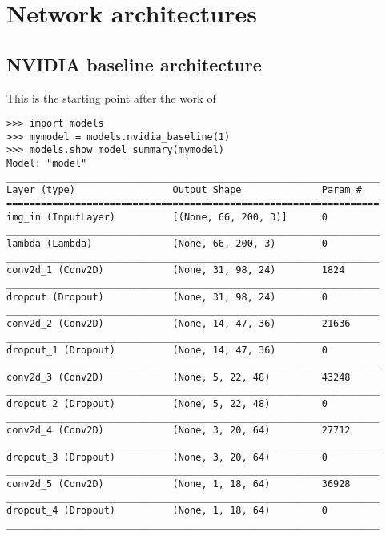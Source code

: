 \chapter{Network architectures} %

\label{AppendixB} %

\section{NVIDIA baseline architecture}
\label{NVIDIA_baseline}
This is the starting point after the work of \cite{bojarski2016end}

\begin{verbatim}
>>> import models
>>> mymodel = models.nvidia_baseline(1)
>>> models.show_model_summary(mymodel)
Model: "model"
_________________________________________________________________
Layer (type)                 Output Shape              Param #   
=================================================================
img_in (InputLayer)          [(None, 66, 200, 3)]      0         
_________________________________________________________________
lambda (Lambda)              (None, 66, 200, 3)        0         
_________________________________________________________________
conv2d_1 (Conv2D)            (None, 31, 98, 24)        1824      
_________________________________________________________________
dropout (Dropout)            (None, 31, 98, 24)        0         
_________________________________________________________________
conv2d_2 (Conv2D)            (None, 14, 47, 36)        21636     
_________________________________________________________________
dropout_1 (Dropout)          (None, 14, 47, 36)        0         
_________________________________________________________________
conv2d_3 (Conv2D)            (None, 5, 22, 48)         43248     
_________________________________________________________________
dropout_2 (Dropout)          (None, 5, 22, 48)         0         
_________________________________________________________________
conv2d_4 (Conv2D)            (None, 3, 20, 64)         27712     
_________________________________________________________________
dropout_3 (Dropout)          (None, 3, 20, 64)         0         
_________________________________________________________________
conv2d_5 (Conv2D)            (None, 1, 18, 64)         36928     
_________________________________________________________________
dropout_4 (Dropout)          (None, 1, 18, 64)         0         
_________________________________________________________________

\end{verbatim}
